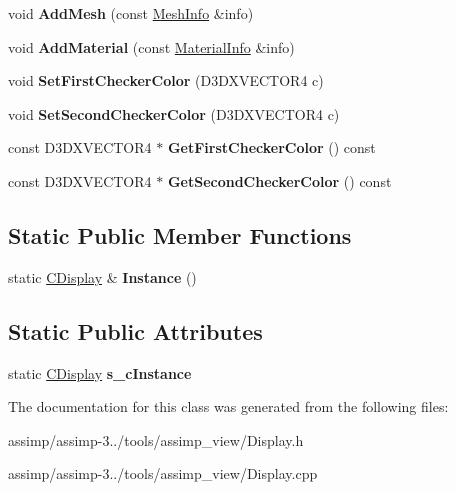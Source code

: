\begin{DoxyCompactItemize}
\item 
\hypertarget{class_c_display_a1f13a6a9187620982ab653fba486fd21}{void {\bfseries Add\+Mesh} (const \hyperlink{struct_c_display_1_1_mesh_info}{Mesh\+Info} \&info)}\label{class_c_display_a1f13a6a9187620982ab653fba486fd21}

\item 
\hypertarget{class_c_display_a8763b2b02e2150f8fcde24e74f876529}{void {\bfseries Add\+Material} (const \hyperlink{struct_c_display_1_1_material_info}{Material\+Info} \&info)}\label{class_c_display_a8763b2b02e2150f8fcde24e74f876529}

\item 
\hypertarget{class_c_display_a9f94936f8184b4771addf5a1aa8de8bc}{void {\bfseries Set\+First\+Checker\+Color} (D3\+D\+X\+V\+E\+C\+T\+O\+R4 c)}\label{class_c_display_a9f94936f8184b4771addf5a1aa8de8bc}

\item 
\hypertarget{class_c_display_a24bb580eb0a101930e98db4816d26850}{void {\bfseries Set\+Second\+Checker\+Color} (D3\+D\+X\+V\+E\+C\+T\+O\+R4 c)}\label{class_c_display_a24bb580eb0a101930e98db4816d26850}

\item 
\hypertarget{class_c_display_a8d6432cc619c692e15e6222f602f04cc}{const D3\+D\+X\+V\+E\+C\+T\+O\+R4 $\ast$ {\bfseries Get\+First\+Checker\+Color} () const }\label{class_c_display_a8d6432cc619c692e15e6222f602f04cc}

\item 
\hypertarget{class_c_display_aec7871b77f78e04892f999100cfecbae}{const D3\+D\+X\+V\+E\+C\+T\+O\+R4 $\ast$ {\bfseries Get\+Second\+Checker\+Color} () const }\label{class_c_display_aec7871b77f78e04892f999100cfecbae}

\end{DoxyCompactItemize}
\subsection*{Static Public Member Functions}
\begin{DoxyCompactItemize}
\item 
\hypertarget{class_c_display_a11ab54a3b1e6191195e0b7656e62c75f}{static \hyperlink{class_c_display}{C\+Display} \& {\bfseries Instance} ()}\label{class_c_display_a11ab54a3b1e6191195e0b7656e62c75f}

\end{DoxyCompactItemize}
\subsection*{Static Public Attributes}
\begin{DoxyCompactItemize}
\item 
\hypertarget{class_c_display_a1f4c1a2c8c6f373b4fcb14b57e257a7e}{static \hyperlink{class_c_display}{C\+Display} {\bfseries s\+\_\+c\+Instance}}\label{class_c_display_a1f4c1a2c8c6f373b4fcb14b57e257a7e}

\end{DoxyCompactItemize}


The documentation for this class was generated from the following files\+:\begin{DoxyCompactItemize}
\item 
assimp/assimp-\/3../tools/assimp\+\_\+view/Display.\+h\item 
assimp/assimp-\/3../tools/assimp\+\_\+view/Display.\+cpp\end{DoxyCompactItemize}
